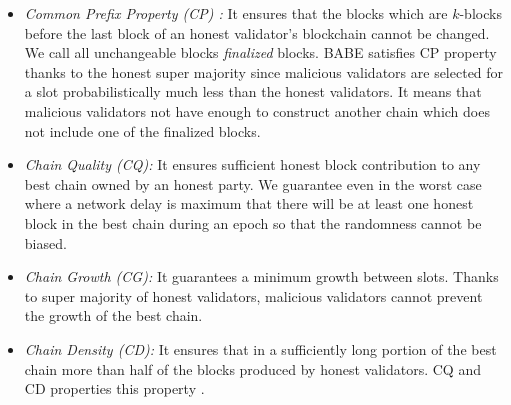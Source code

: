 \begin{itemize}
	\item \emph{Common Prefix Property (CP) :} It ensures that the blocks which are $ k $-blocks before the last block of an honest validator's blockchain cannot be changed. We call  all unchangeable blocks  \emph{finalized} blocks. BABE satisfies CP property thanks to the honest super majority since malicious validators are selected for a slot probabilistically much less than the honest validators. It means that malicious validators  not have enough  to construct another chain which does not include one of the finalized blocks.
	\item \emph{Chain Quality (CQ):} It ensures sufficient honest block contribution to any best chain owned by an honest party.	We guarantee even in the worst case where a network delay is maximum that there will be at least one honest block in the best chain during an epoch so that the randomness cannot be biased.
	\item \emph{Chain Growth (CG):} It guarantees a minimum growth between slots. Thanks to super majority of honest validators, malicious validators cannot prevent the growth of the best chain.	
	
	\item \emph{Chain Density (CD):} It ensures that in a sufficiently long portion of the best chain more than half of the blocks produced by honest validators. CQ and CD properties  this property \cite{Praos}.
\end{itemize}


